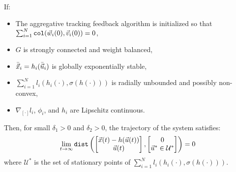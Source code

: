\begin{theorem}
    If:
    \begin{itemize}
        \item The aggregative tracking feedback algorithm is initialized so that $\sum_{i=1}^{N} \texttt{col}({\vec{w}}_i(0), {\vec{v}}_i(0)) = 0$,
        \item $G$ is strongly connected and weight balanced,
        \item $\bar{{\vec{x}}}_i = h_i(\bar{{\vec{u}}}_i)$ is globally exponentially stable,
        \item $\sum_{i=1}^{N} l_i(h_i(\cdot), \sigma(h(\cdot)))$ is radially unbounded and possibly non-convex,
        \item $\nabla_{[\cdot]} l_i$, $\phi_i$, and $h_i$ are Lipschitz continuous.
    \end{itemize}
    Then, for small $\delta_1 > 0$ and $\delta_2 > 0$, the trajectory of the system satisfies:
    \[
        \lim_{t \rightarrow \infty} \texttt{dist}\left( \begin{bmatrix} {\vec{x}}(t) - h({\vec{u}}(t)) \\ {\vec{u}}(t) \end{bmatrix}, \begin{bmatrix} 0 \\ {\vec{u}}^* \in \mathcal{U}^* \end{bmatrix} \right) = 0
    \]
    where $\mathcal{U}^*$ is the set of stationary points of $\sum_{i=1}^{N} l_i(h_i(\cdot), \sigma(h(\cdot)))$.
\end{theorem}
